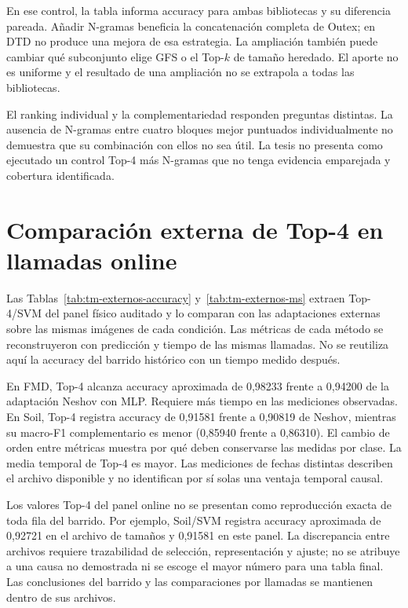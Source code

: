 

En ese control, la tabla informa accuracy para ambas bibliotecas y su diferencia pareada. Añadir N-gramas beneficia la concatenación completa de Outex; en DTD no produce una mejora de esa estrategia. La ampliación también puede cambiar qué subconjunto elige GFS o el Top-\(k\) de tamaño heredado. El aporte no es uniforme y el resultado de una ampliación no se extrapola a todas las bibliotecas.

El ranking individual y la complementariedad responden preguntas distintas. La ausencia de N-gramas entre cuatro bloques mejor puntuados individualmente no demuestra que su combinación con ellos no sea útil. La tesis no presenta como ejecutado un control Top-4 más N-gramas que no tenga evidencia emparejada y cobertura identificada.

\section{Comparación externa de Top-4 en llamadas online}\label{sec:resultados-panel-online-sota}
Las Tablas~\ref{tab:tm-externos-accuracy} y~\ref{tab:tm-externos-ms} extraen Top-4/SVM del panel físico auditado y lo comparan con las adaptaciones externas sobre las mismas imágenes de cada condición. Las métricas de cada método se reconstruyeron con predicción y tiempo de las mismas llamadas. No se reutiliza aquí la accuracy del barrido histórico con un tiempo medido después.




En FMD, Top-4 alcanza accuracy aproximada de 0,98233 frente a 0,94200 de la adaptación Neshov con MLP. Requiere más tiempo en las mediciones observadas. En Soil, Top-4 registra accuracy de 0,91581 frente a 0,90819 de Neshov, mientras su macro-F1 complementario es menor (0,85940 frente a 0,86310). El cambio de orden entre métricas muestra por qué deben conservarse las medidas por clase. La media temporal de Top-4 es mayor. Las mediciones de fechas distintas describen el archivo disponible y no identifican por sí solas una ventaja temporal causal.

Los valores Top-4 del panel online no se presentan como reproducción exacta de toda fila del barrido. Por ejemplo, Soil/SVM registra accuracy aproximada de 0,92721 en el archivo de tamaños y 0,91581 en este panel. La discrepancia entre archivos requiere trazabilidad de selección, representación y ajuste; no se atribuye a una causa no demostrada ni se escoge el mayor número para una tabla final. Las conclusiones del barrido y las comparaciones por llamadas se mantienen dentro de sus archivos.

